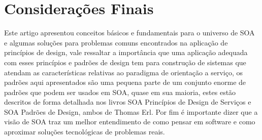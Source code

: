 \documentclass[12pt]{article}
\begin{document}
\section{Considerações Finais}

Este artigo apresentou conceitos básicos e fundamentais para o universo de SOA e algumas soluções para problemas comuns encontrados na aplicação de princípios de design, vale ressaltar a importância que uma aplicação adequada com esses princípios e padrões de design tem para construção de sistemas que atendam as características relativas ao paradigma de orientação a serviço, os padrões aqui apresentados são uma pequena parte de um conjunto enorme de padrões que podem ser usados em SOA, quase em sua maioria, estes estão descritos de forma detalhada nos livros SOA Princípios de Design de Serviços e SOA Padrões de Design, ambos de Thomas Erl. Por fim é importante dizer que a visão de SOA traz um melhor entendimento de como pensar em software e como aproximar soluções tecnológicas de problemas reais.

\nocite{daigneau}
\nocite{gartner}
\nocite{erl_principio}
\nocite{dev1}
\nocite{dev2}
\nocite{baccaro}
\nocite{wiki}
\nocite{soa_patterns}



\end{document}
